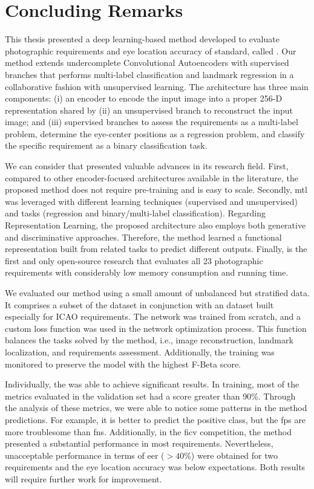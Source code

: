 \section{Concluding Remarks}

This thesis presented a deep learning-based method developed to evaluate photographic requirements and eye location accuracy of \icao standard, called \methodname. Our method extends undercomplete Convolutional Autoencoders with supervised branches that performs multi-label classification and landmark regression in a collaborative fashion with unsupervised learning. The architecture has three main components: (i) an encoder to encode the input image into a proper 256-D representation shared by (ii) an unsupervised branch to reconstruct the input image; and (iii) supervised branches to assess the requirements as a multi-label problem, determine the eye-center positions as a regression problem, and classify the specific \pixelation requirement as a binary classification task.

We can consider that \methodname presented valuable advances in its research field. First, compared to other encoder-focused architectures available in the literature, the proposed method does not require pre-training and is easy to scale. Secondly, \acl{mtl} was leveraged with different learning techniques (supervised and unsupervised) and tasks (regression and binary/multi-label classification). Regarding Representation Learning, the proposed architecture also employs both generative and discriminative approaches. Therefore, the method learned a functional representation built from related tasks to predict different outputs. Finally, \methodname is the first and only open-source research that evaluates all 23 photographic requirements with considerably low memory consumption and running time.

We evaluated our method using a small amount of unbalanced but stratified data. It comprises a subset of the \ficvtest dataset in conjunction with an \adhoc dataset built especially for ICAO requirements. The network was trained from scratch, and a custom loss function was used in the network optimization process. This function balances the tasks solved by the method, i.e., image reconstruction, landmark localization, and requirements assessment. Additionally, the training was monitored to preserve the model with the highest F-Beta score.

Individually, the \methodname was able to achieve significant results. In training, most of the metrics evaluated in the validation set had a score greater than 90\%. Through the analysis of these metrics, we were able to notice some patterns in the method predictions. For example, it is better to predict the positive class, but the \aclp{fp} are more troublesome than \aclp{fn}. Additionally, in the \acs{ficv} competition, the method presented a substantial performance in most requirements. Nevertheless, unacceptable performance in terms of \acs{eer} ($> 40\%$) were obtained for two requirements and the eye location accuracy was below expectations. Both results will require further work for improvement.

